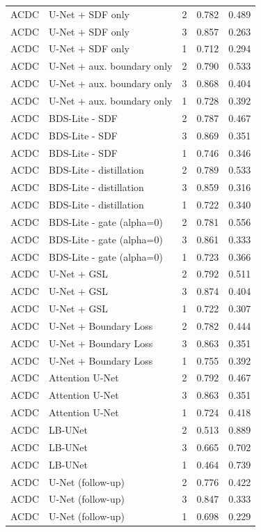 \begin{longtable}{lllll}
ACDC & U-Net + SDF only & 2 & 0.782 & 0.489 \\
ACDC & U-Net + SDF only & 3 & 0.857 & 0.263 \\
ACDC & U-Net + SDF only & 1 & 0.712 & 0.294 \\
ACDC & U-Net + aux. boundary only & 2 & 0.790 & 0.533 \\
ACDC & U-Net + aux. boundary only & 3 & 0.868 & 0.404 \\
ACDC & U-Net + aux. boundary only & 1 & 0.728 & 0.392 \\
ACDC & BDS-Lite - SDF & 2 & 0.787 & 0.467 \\
ACDC & BDS-Lite - SDF & 3 & 0.869 & 0.351 \\
ACDC & BDS-Lite - SDF & 1 & 0.746 & 0.346 \\
ACDC & BDS-Lite - distillation & 2 & 0.789 & 0.533 \\
ACDC & BDS-Lite - distillation & 3 & 0.859 & 0.316 \\
ACDC & BDS-Lite - distillation & 1 & 0.722 & 0.340 \\
ACDC & BDS-Lite - gate (alpha=0) & 2 & 0.781 & 0.556 \\
ACDC & BDS-Lite - gate (alpha=0) & 3 & 0.861 & 0.333 \\
ACDC & BDS-Lite - gate (alpha=0) & 1 & 0.723 & 0.366 \\
ACDC & U-Net + GSL & 2 & 0.792 & 0.511 \\
ACDC & U-Net + GSL & 3 & 0.874 & 0.404 \\
ACDC & U-Net + GSL & 1 & 0.722 & 0.307 \\
ACDC & U-Net + Boundary Loss & 2 & 0.782 & 0.444 \\
ACDC & U-Net + Boundary Loss & 3 & 0.863 & 0.351 \\
ACDC & U-Net + Boundary Loss & 1 & 0.755 & 0.392 \\
ACDC & Attention U-Net & 2 & 0.792 & 0.467 \\
ACDC & Attention U-Net & 3 & 0.863 & 0.351 \\
ACDC & Attention U-Net & 1 & 0.724 & 0.418 \\
ACDC & LB-UNet & 2 & 0.513 & 0.889 \\
ACDC & LB-UNet & 3 & 0.665 & 0.702 \\
ACDC & LB-UNet & 1 & 0.464 & 0.739 \\
ACDC & U-Net (follow-up) & 2 & 0.776 & 0.422 \\
ACDC & U-Net (follow-up) & 3 & 0.847 & 0.333 \\
ACDC & U-Net (follow-up) & 1 & 0.698 & 0.229 \\

\end{longtable}
